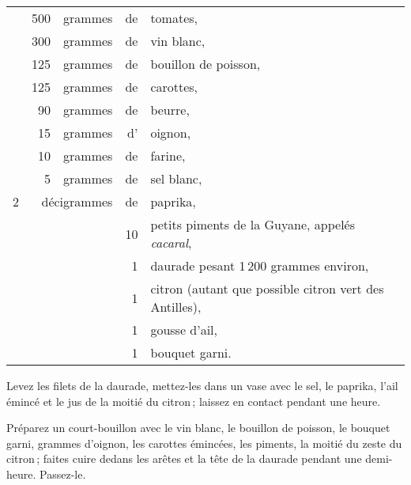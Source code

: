 \footnotesize
\begin{longtable}{rrrrp{16em}}
  & 500 & grammes     & de & tomates,                                                                     \\
  & 300 & grammes     & de & vin blanc,                                                                   \\
  & 125 & grammes     & de & bouillon de poisson,                                                         \\
  & 125 & grammes     & de & carottes,                                                                    \\
  &  90 & grammes     & de & beurre,                                                                      \\
  &  15 & grammes     & d' & oignon,                                                                      \\
  &  10 & grammes     & de & farine,                                                                      \\
  &   5 & grammes     & de & sel blanc,                                                                   \\
2 & \multicolumn{2}{r}{décigrammes}   & de & paprika,                                                     \\
  &     &             & 10 & petits piments de la Guyane, appelés \textit{cacaral},                       \\
  &     &             &  1 & daurade pesant 1 200 grammes environ,                                        \\
  &     &             &  1 & citron (autant que possible citron vert des Antilles),                       \\
  &     &             &  1 & gousse d'ail,                                                                \\
  &     &             &  1 & bouquet garni.                                                               \\
\end{longtable}
\normalsize

Levez les filets de la daurade, mettez-les dans un vase avec le sel, le
paprika, l'ail émincé et le jus de la moitié du citron ; laissez en contact
pendant une heure.

Préparez un court-bouillon avec le vin blanc, le bouillon de poisson, le
bouquet garni, {\mmm} grammes d'oignon, les carottes émincées, les piments, la
moitié du zeste du citron ; faites cuire dedans les arêtes et la tête de la
daurade pendant une demi-heure. Passez-le.

